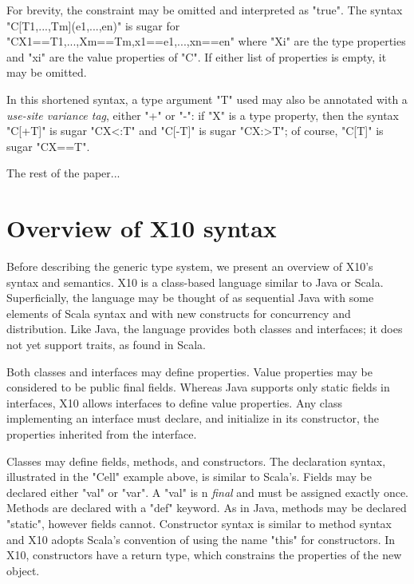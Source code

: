 \documentclass[nocopyrightspace,9pt]{sigplanconf}
\begin{document}
For brevity, the constraint may be omitted and
interpreted as \xcd"true".
The syntax 
\xcd"C[T1,...,Tm](e1,...,en)" is sugar for
\xcd"C{X1==T1,...,Xm==Tm,x1==e1,...,xn==en}"
where \xcd"Xi" are the type properties and \xcd"xi" are the
value properties of \xcd"C".  
If either list of properties is empty, it may be omitted.

In this shortened syntax, a type argument \xcd"T" used may also be annotated
with
a \emph{use-site variance tag}, either \xcd"+" or \xcd"-":
if \xcd"X" is a type property, then
the syntax \xcd"C[+T]" is sugar \xcd"C{X<:T}" and
\xcd"C[-T]" is sugar \xcd"C{X:>T}"; of course,
\xcd"C[T]" is sugar \xcd"C{X==T}".

The rest of the paper...

\section{Overview of X10 syntax}

Before describing the generic type system, we present an
overview of X10's syntax and semantics.
X10 is a class-based language similar to Java or Scala.
Superficially, the language may be thought of as sequential
Java with some elements of Scala syntax and with new constructs
for concurrency and distribution.
Like Java, the language provides both classes and interfaces; it does not
yet support traits, as found in Scala.

Both classes and interfaces may define properties. Value
properties may be considered to be public final fields. Whereas
Java supports only static fields in interfaces, X10
allows interfaces to define value properties. Any class implementing
an interface must declare, and initialize in its
constructor,
the properties inherited from the interface.

Classes may define fields, methods, and constructors. The
declaration syntax,
illustrated in the \xcd"Cell" example
above,
is similar to Scala's.  Fields may be
declared either \xcd"val" or \xcd"var".  A \xcd"val" is n
\emph{final} and must be assigned exactly once.  Methods are
declared with a \xcd"def" keyword.
As in Java, methods may be declared \xcd"static", however fields cannot.
Constructor syntax is
similar to method syntax and X10 adopts Scala's convention of
using the name \xcd"this" for constructors.
In X10, constructors have a return type, which constrains
the properties of the new object.
\end{document}
